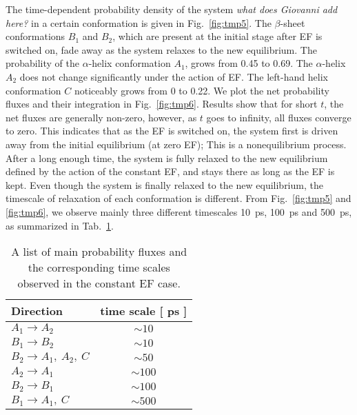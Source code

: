 \documentclass[a4paper,preprint,unsortedaddress,onecolumn]{revtex4-1}
\newcommand{\recheck}[1]{{\color{red} #1}}
\newcommand{\bluec}[1]{{\color{blue} #1}}
\begin{document}
The time-dependent probability density of \bluec{the system \textit{what does Giovanni add here?} in} a certain
conformation is given in
Fig.~\ref{fig:tmp5}. The $\beta$-sheet conformations $B_1$ and $B_2$,
which are present at the initial stage after EF is switched on,
fade away as the system relaxes to the new equilibrium. The
probability of the $\alpha$-helix conformation $A_1$, grows from 0.45 to 0.69.
The $\alpha$-helix $A_2$  does not change significantly  under the action of EF.
The left-hand helix conformation $C$ noticeably grows from 0 to 0.22.
We plot the net probability fluxes and their integration in Fig.~\ref{fig:tmp6}.
Results show that for short $t$, the net fluxes are generally non-zero, however, 
as $t$ goes to infinity,
all fluxes converge to zero. This indicates
that as the EF is switched on, the system first is driven away from the initial
equilibrium (at zero EF);  This is a nonequilibrium process.
After a long enough time, the system
is fully relaxed to the new equilibrium defined by the action of the constant EF,
and stays there as long as the EF is kept.
\recheck{
Even though the system is finally relaxed to the new equilibrium,
the timescale of relaxation of each conformation is different. 
From Fig.~\ref{fig:tmp5} and \ref{fig:tmp6}, we observe mainly
three different timescales 10~ps, 100~ps and 500~ps,
as summarized in Tab.~\ref{tab:tmp1}.
}

\begin{table}
  \centering
  \begin{tabular*}{0.4\textwidth}{@{\extracolsep{\fill}}lc}\hline\hline
    Direction        & time scale [ ps ] \\\hline
    $A_1\rightarrow A_2$        &       $\sim 10$      \\
    $B_1\rightarrow B_2$        &       $\sim 10$      \\    
    $B_2\rightarrow A_1,\ A_2,\ C$        &       $\sim 50$      \\    
    $A_2\rightarrow A_1$        &       $\sim 100$      \\
    $B_2\rightarrow B_1$        &       $\sim 100$      \\    
    $B_1\rightarrow A_1,\ C$        &       $\sim 500$      \\    \hline\hline
  \end{tabular*}
  \caption{A list of main probability fluxes and the corresponding time scales observed in the constant EF case.}
  \label{tab:tmp1}
\end{table}
\end{document}
